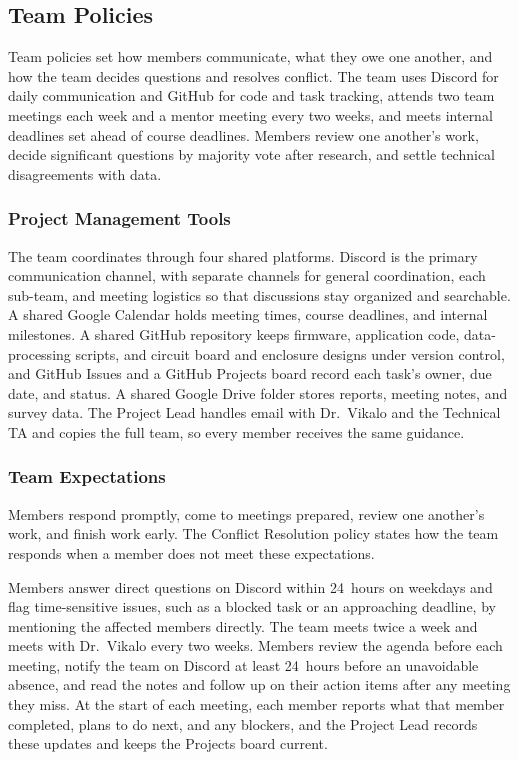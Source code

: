 \documentclass[12pt,letterpaper]{article}
\begin{document}
\subsection{Team Policies}
Team policies set how members communicate, what they owe one another, and how the team decides
questions and resolves conflict. The team uses Discord for daily communication and GitHub for code
and task tracking, attends two team meetings each week and a mentor meeting every two weeks, and
meets internal deadlines set ahead of course deadlines. Members review one another's work, decide
significant questions by majority vote after research, and settle technical disagreements with
data.

\subsubsection{Project Management Tools}
The team coordinates through four shared platforms. Discord is the primary communication channel,
with separate channels for general coordination, each sub-team, and meeting logistics so that
discussions stay organized and searchable. A shared Google Calendar holds meeting times, course
deadlines, and internal milestones. A shared GitHub repository keeps firmware, application code,
data-processing scripts, and circuit board and enclosure designs under version control, and GitHub
Issues and a GitHub Projects board record each task's owner, due date, and status. A shared Google
Drive folder stores reports, meeting notes, and survey data. The Project Lead handles email with
Dr.\ Vikalo and the Technical TA and copies the full team, so every member receives the same
guidance.

\subsubsection{Team Expectations}
Members respond promptly, come to meetings prepared, review one another's work, and finish work
early. The Conflict Resolution policy states how the team responds when a member does not meet
these expectations.

Members answer direct questions on Discord within 24~hours on weekdays and flag time-sensitive
issues, such as a blocked task or an approaching deadline, by mentioning the affected members
directly. The team meets twice a week and meets with Dr.\ Vikalo every two weeks. Members review the
agenda before each meeting, notify the team on Discord at least 24~hours before an unavoidable
absence, and read the notes and follow up on their action items after any meeting they miss. At the
start of each meeting, each member reports what that member completed, plans to do next, and any
blockers, and the Project Lead records these updates and keeps the Projects board current.
\end{document}
